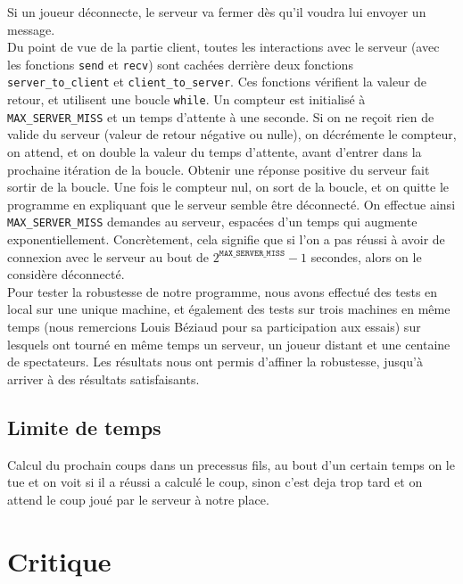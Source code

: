\documentclass[a4paper]{article}
\begin{document}
Si un joueur déconnecte, le serveur va fermer dès qu'il voudra lui envoyer un message. \\

Du point de vue de la partie client, toutes les interactions avec le serveur 
(avec les fonctions \texttt{send} et \texttt{recv}) sont cachées derrière deux 
fonctions \texttt{server\_to\_client} et \texttt{client\_to\_server}. Ces 
fonctions vérifient la valeur de retour, et utilisent une boucle 
\texttt{while}. Un compteur est initialisé à \texttt{MAX\_SERVER\_MISS} et un 
temps d'attente à une seconde. Si on ne reçoit rien de valide du serveur 
(valeur de retour négative ou nulle), on décrémente le compteur, on attend, et 
on double la valeur du temps d'attente, avant d'entrer dans la prochaine 
itération de la boucle. Obtenir une réponse positive du serveur fait sortir de 
la boucle. Une fois le compteur nul, on sort de la boucle, et on quitte le 
programme en expliquant que le serveur semble être déconnecté. On effectue 
ainsi \texttt{MAX\_SERVER\_MISS} demandes au serveur, espacées d'un temps qui 
augmente exponentiellement. Concrètement, cela signifie que si l'on a pas 
réussi à avoir de connexion avec le serveur au bout de 
$2^{\texttt{MAX\_SERVER\_MISS}} - 1$ secondes, alors on le considère déconnecté. \\

Pour tester la robustesse de notre programme, nous avons effectué des tests en local sur une unique machine,
et également des tests sur trois machines en même temps (nous remercions Louis Béziaud pour sa participation aux essais)
sur lesquels ont tourné en même temps un serveur, un joueur distant et une centaine de spectateurs.
Les résultats nous ont permis d'affiner la robustesse, jusqu'à arriver à des résultats satisfaisants.


\subsection{Limite de temps}

Calcul du prochain coups dans un precessus fils, au bout d'un certain temps on 
le tue et on voit si il a réussi a calculé le coup, sinon c'est deja trop tard 
et on attend le coup joué par le serveur à notre place.



\section{Critique}
\end{document}
